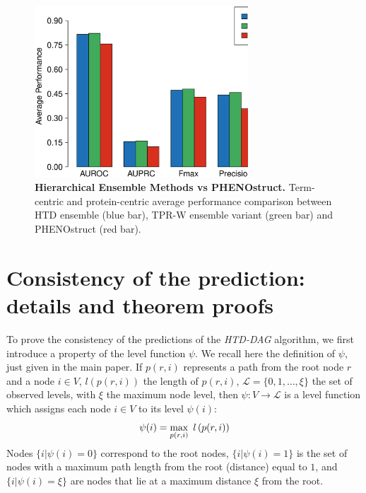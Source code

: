 \documentclass{bioinfo}
\begin{document}
\begin{figure}[!h]
\centering	
\includegraphics[width=8.0cm]{Fig_ExpII/BarPlot_Best_Res_Shrink.eps}
\vskip -0.25in
\caption{{\bf Hierarchical Ensemble Methods vs PHENOstruct.} Term-centric and protein-centric average performance comparison between HTD ensemble (blue bar), TPR-W ensemble variant (green bar) and PHENOstruct (red bar).}
\label{fig:barplot}
\vskip -0.1in
\end{figure}

\section{Consistency of the prediction: details and theorem proofs}
To prove the consistency of the predictions of the {\em HTD-DAG} algorithm, we first introduce a property of the level function $\psi$.
We recall here the definition of $\psi$, just given in the main paper.
If $p(r,i)$ represents a path from the root node $r$ and a node $i \in V$, $l \left(p(r,i)\right)$  the length of $p(r,i)$, $\mathcal L = \{0, 1, \ldots, \xi \}$ the set of observed levels, with $\xi$  the maximum node level, then $\psi: V \longrightarrow \mathcal L$ is a level function which assigns each node $i\in V$ to its level $\psi(i)$:
\vspace*{-5pt}
\begin{equation}
\psi(i) = \max_{p(r,i)}\ l \left(p(r,i)\right)
\label{eq:psi}
\vspace*{-5pt}
\end{equation}
Nodes $ \{i | \psi(i) = 0 \}$ correspond to the root nodes, $ \{i | \psi(i) = 1 \}$ is the set of nodes  with a maximum path length from the root (distance) equal to $1$, and $ \{i | \psi(i) = \xi \}$ are nodes that lie at a maximum distance $\xi$ from the root.
\end{document}
